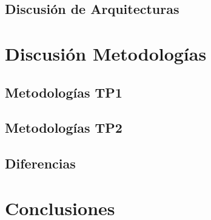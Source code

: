 \documentclass[a4paper, 11pt]{article}
\begin{document}
\subsection{Discusión de Arquitecturas}

\newpage
\section{Discusión Metodologías}
\subsection{Metodologías TP1}
\subsection{Metodologías TP2}
\subsection{Diferencias}

\newpage
\section{Conclusiones}
\end{document}
